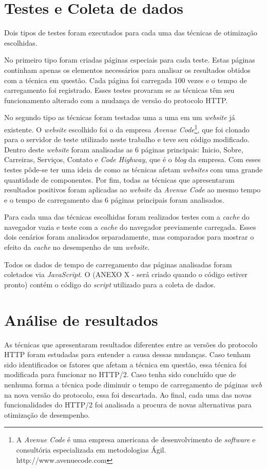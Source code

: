 \section{Testes e Coleta de dados}

Dois tipos de testes foram executados para cada uma das técnicas de otimização escolhidas.

No primeiro tipo foram criadas páginas especiais para cada teste. Estas páginas continham apenas os elementos necessários para analisar os resultados obtidos com a técnica em questão. Cada página foi carregada 100 vezes e o tempo de carregamento foi registrado. Esses testes provaram se as técnicas têm seu funcionamento alterado com a mudança de versão do protocolo HTTP.

No segundo tipo as técnicas foram testadas uma a uma em um \textit{website} já existente. O \textit{website} escolhido foi o da empresa \textit{Avenue Code}\footnote{A \textit{Avenue Code} é uma empresa americana de desenvolvimento de \textit{software} e consultória especializada em metodologias Ágil. http://www.avenuecode.com}, que foi clonado para o servidor de teste utilizado neste trabalho e teve seu código modificado. Dentro deste \textit{website} foram analisadas as 6 páginas principais: Inicio, Sobre, Carreiras, Serviços, Contato e \textit{Code Highway}, que é o \textit{blog} da empresa. Com esses testes pôde-se ter uma ideia de como as técnicas afetam \textit{websites} com uma grande quantidade de componentes. Por fim, todas as técnicas que apresentaram resultados positivos foram aplicadas ao \textit{website} da \textit{Avenue Code} ao mesmo tempo e o tempo de carregamento das 6 páginas principais foram analisados.

Para cada uma das técnicas escolhidas foram realizados testes com a \textit{cache} do navegador vazia e teste com a \textit{cache} do navegador previamente carregada. Esses dois cenários foram analisados separadamente, mas comparados para mostrar o efeito da \textit{cache} no desempenho de um \textit{website}.

Todos os dados de tempo de carregamento das páginas analisadas foram coletados via \textit{JavaScript}. O (ANEXO X - será criado quando o código estiver pronto) contém o código do \textit{script} utilizado para a coleta de dados.

\section{Análise de resultados}

As técnicas que apresentaram resultados diferentes entre as versões do protocolo HTTP foram estudadas para entender a causa dessas mudanças. Caso tenham sido identificados os fatores que afetam a técnica em questão, essa técnica foi modificada para funcionar no HTTP/2. Caso tenha sido concluído que de nenhuma forma a técnica pode diminuir o tempo de carregamento de páginas \textit{web} na nova versão do protocolo, essa foi descartada. Ao final, cada uma das novas funcionalidades do HTTP/2 foi analisada a procura de novas alternativas para otimização de desempenho.